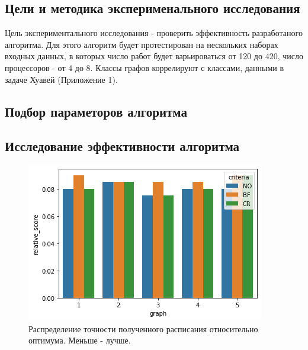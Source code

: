 \subsection{Цели и методика эксперименального исследования}
Цель экспериментального исследования - проверить эффективность разработаного алгоритма. Для этого алгоритм будет протестирован на нескольких наборах входных данных,  в которых число работ будет варьироваться от 120 до 420, число процессоров - от 4 до 8. Классы графов коррелируют с классами, данными в задаче Хуавей (Приложение 1).

\subsection{Подбор параметоров алгоритма}

\subsection{Исследование эффективности алгоритма}

\begin{figure}[H]
    \centering
    \includegraphics{imgs/relative_score.png}
    \caption{Распределение точности полученного расписания относительно оптимума. Меньше - лучше.}
    \label{pic:relative_score}
\end{figure}

